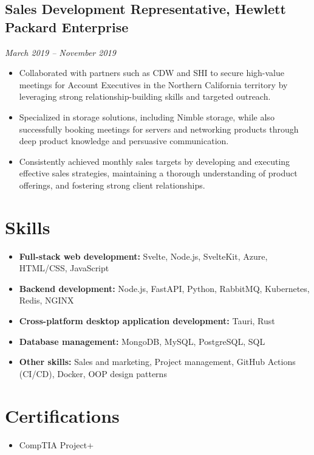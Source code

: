 \documentclass[a4paper,10pt]{article}
\begin{document}
\subsection*{Sales Development Representative, Hewlett Packard Enterprise}
\textit{March 2019 -- November 2019}
\begin{itemize}
    \item Collaborated with partners such as CDW and SHI to secure high-value meetings for Account Executives in the Northern California territory by leveraging strong relationship-building skills and targeted outreach.
    \item Specialized in storage solutions, including Nimble storage, while also successfully booking meetings for servers and networking products through deep product knowledge and persuasive communication.
    \item Consistently achieved monthly sales targets by developing and executing effective sales strategies, maintaining a thorough understanding of product offerings, and fostering strong client relationships.
\end{itemize}

\section*{Skills}
\begin{itemize}[leftmargin=0in, label={}]
    \item \textbf{Full-stack web development:} Svelte, Node.js, SvelteKit, Azure, HTML/CSS, JavaScript
    \item \textbf{Backend development:} Node.js, FastAPI, Python, RabbitMQ, Kubernetes, Redis, NGINX
    \item \textbf{Cross-platform desktop application development:} Tauri, Rust
    \item \textbf{Database management:} MongoDB, MySQL, PostgreSQL, SQL
    \item \textbf{Other skills:} Sales and marketing, Project management, GitHub Actions (CI/CD), Docker, OOP design patterns
\end{itemize}

\section*{Certifications}
\begin{itemize}[leftmargin=0in, label={}]
    \item CompTIA Project+
\end{itemize}
\end{document}
